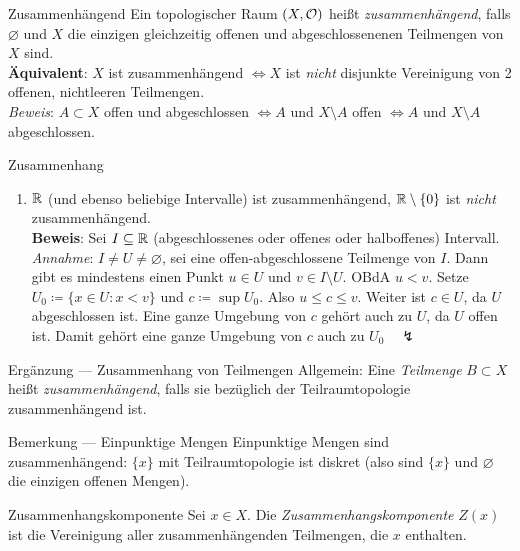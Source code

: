 \begin{definition}{Zusammenhängend}
  Ein topologischer Raum $ (X, \mathcal{O}) $ heißt \emph{zusammenhängend}, falls $ \varnothing $ und $ X $ die einzigen gleichzeitig offenen und abgeschlossenenen Teilmengen von $ X $ sind. \\
  \textbf{Äquivalent}: $ X $ ist zusammenhängend $ \Leftrightarrow X $ ist \emph{nicht} disjunkte Vereinigung von 2 offenen, nichtleeren Teilmengen. \\
  \emph{Beweis}: $ A \subset X $ offen und abgeschlossen $ \Leftrightarrow A $ und $ X \setminus A $ offen $ \Leftrightarrow A $ und $ X \setminus A $ abgeschlossen.
\end{definition}

\begin{example}{Zusammenhang}
  \begin{enumerate}
    \item $ \mathbb{R} $ (und ebenso beliebige Intervalle) ist zusammenhängend, $ \mathbb{R} \setminus \{ 0 \} $ ist \emph{nicht} zusammenhängend. \\
      \textbf{Beweis}: Sei $ I \subseteq \mathbb{R} $ (abgeschlossenes oder offenes oder halboffenes) Intervall. \\
      \emph{Annahme}: $ I \neq U \neq \varnothing $, sei eine offen-abgeschlossene Teilmenge von $ I $. Dann gibt es mindestens einen Punkt $ u \in U $ und $ v \in I \setminus U $. OBdA $ u < v $. Setze $ U_0 \coloneqq \{ x \in U : x < v \} $ und $ c \coloneqq \sup U_0 $. Also $ u \leq c \leq v $. Weiter ist $ c \in U $, da $ U $ abgeschlossen ist. Eine ganze Umgebung von $ c $ gehört auch zu $ U $, da $ U $ offen ist. Damit gehört eine ganze Umgebung von $ c $ auch zu $ U_0 \quad \lightning $
  \end{enumerate}
\end{example}

\begin{remark}{Ergänzung --- Zusammenhang von Teilmengen}
  Allgemein: Eine \emph{Teilmenge} $ B \subset X $ heißt \emph{zusammenhängend}, falls sie bezüglich der Teilraumtopologie zusammenhängend ist.
\end{remark}

\begin{remark}{Bemerkung --- Einpunktige Mengen}
  Einpunktige Mengen sind zusammenhängend: $ \{ x \} $ mit Teilraumtopologie ist diskret (also sind $ \{ x \} $ und $ \varnothing $ die einzigen offenen Mengen).
\end{remark}

\begin{definition}{Zusammenhangskomponente}
  Sei $ x \in X $. Die \emph{Zusammenhangskomponente} $ Z(x) $ ist die Vereinigung aller zusammenhängenden Teilmengen, die $ x $ enthalten.
\end{definition}

